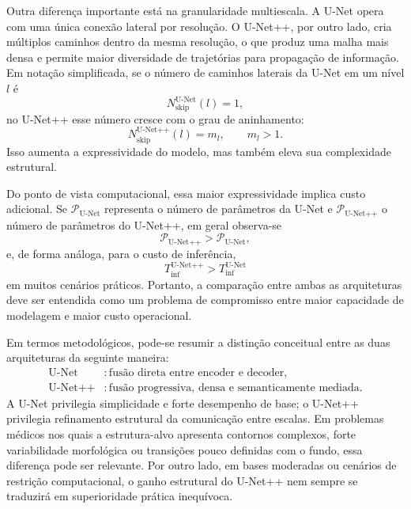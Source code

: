 \documentclass[tcc,capa]{texufpel}
\begin{document}
Outra diferença importante está na granularidade multiescala. A U-Net opera com uma única conexão lateral por resolução. O U-Net++, por outro lado, cria múltiplos caminhos dentro da mesma resolução, o que produz uma malha mais densa e permite maior diversidade de trajetórias para propagação de informação. Em notação simplificada, se o número de caminhos laterais da U-Net em um nível \(l\) é
\begin{equation}
	N_{\text{skip}}^{\text{U-Net}}(l)=1,
\end{equation}
no U-Net++ esse número cresce com o grau de aninhamento:
\begin{equation}
	N_{\text{skip}}^{\text{U-Net++}}(l)=m_l,
	\qquad m_l > 1.
\end{equation}
Isso aumenta a expressividade do modelo, mas também eleva sua complexidade estrutural.

Do ponto de vista computacional, essa maior expressividade implica custo adicional. Se \(\mathcal{P}_{\text{U-Net}}\) representa o número de parâmetros da U-Net e \(\mathcal{P}_{\text{U-Net++}}\) o número de parâmetros do U-Net++, em geral observa-se
\begin{equation}
	\mathcal{P}_{\text{U-Net++}} > \mathcal{P}_{\text{U-Net}},
\end{equation}
e, de forma análoga, para o custo de inferência,
\begin{equation}
	T_{\text{inf}}^{\text{U-Net++}} > T_{\text{inf}}^{\text{U-Net}}
\end{equation}
em muitos cenários práticos. Portanto, a comparação entre ambas as arquiteturas deve ser entendida como um problema de compromisso entre maior capacidade de modelagem e maior custo operacional.

Em termos metodológicos, pode-se resumir a distinção conceitual entre as duas arquiteturas da seguinte maneira:
\begin{align}
	\text{U-Net} &: \text{fusão direta entre encoder e decoder},\\
	\text{U-Net++} &: \text{fusão progressiva, densa e semanticamente mediada}.
\end{align}
A U-Net privilegia simplicidade e forte desempenho de base; o U-Net++ privilegia refinamento estrutural da comunicação entre escalas. Em problemas médicos nos quais a estrutura-alvo apresenta contornos complexos, forte variabilidade morfológica ou transições pouco definidas com o fundo, essa diferença pode ser relevante. Por outro lado, em bases moderadas ou cenários de restrição computacional, o ganho estrutural do U-Net++ nem sempre se traduzirá em superioridade prática inequívoca.
\end{document}
